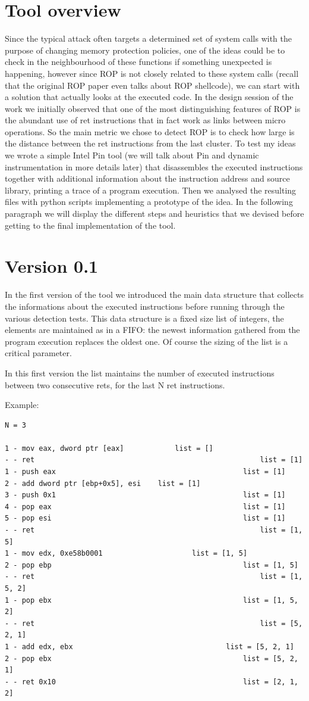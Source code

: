 \documentclass[Lau,binding=0.6cm]{sapthesis}
\begin{document}
\section{Tool overview}

Since the typical attack often targets a determined set of system calls with the purpose of changing memory protection policies, one of the ideas could be to check in the neighbourhood of these functions if something unexpected is happening, however since ROP is not closely related to these system calls (recall that the original ROP paper even talks about ROP shellcode), we can start with a solution that actually looks at the executed code.
In the design session of the work we initially observed that one of the most distinguishing features of ROP is the abundant use of ret instructions that in fact work as links between micro operations. So the main metric we chose to detect ROP is to check how large is the distance between the ret instructions from the last cluster.
To test my ideas we wrote a simple Intel Pin tool (we will talk about Pin and dynamic instrumentation in more details later) that disassembles the executed instructions together with additional information about the instruction address and source library, printing a trace of a program execution. Then we analysed the resulting files with python scripts implementing a prototype of the idea.
In the following paragraph we will display the different steps and heuristics that we devised before getting to the final implementation of the tool.

\section{Version 0.1}

In the first version of the tool we introduced the main data structure that collects the informations about the executed instructions before running through the various detection tests.
This data structure is a fixed size list of integers, the elements are maintained as in a FIFO: the newest information gathered from the program execution replaces the oldest one. Of course the sizing of the list is a critical parameter. 

In this first version the list maintains the number of executed instructions between two consecutive rets, for the last N ret instructions.

Example: 
\begin{lstlisting}
N = 3

1 - mov eax, dword ptr [eax]			list = []
- - ret														list = [1]
1 - push eax											list = [1]
2 - add dword ptr [ebp+0x5], esi	list = [1]
3 - push 0x1											list = [1]
4 - pop eax												list = [1]
5 - pop esi												list = [1]
- - ret														list = [1, 5]
1 - mov edx, 0xe58b0001						list = [1, 5]
2 - pop ebp												list = [1, 5]
- - ret														list = [1, 5, 2]
1 - pop ebx												list = [1, 5, 2]
- - ret														list = [5, 2, 1]
1 - add edx, ebx									list = [5, 2, 1]
2 - pop ebx												list = [5, 2, 1]
- - ret 0x10											list = [2, 1, 2]

\end{lstlisting}
\end{document}
